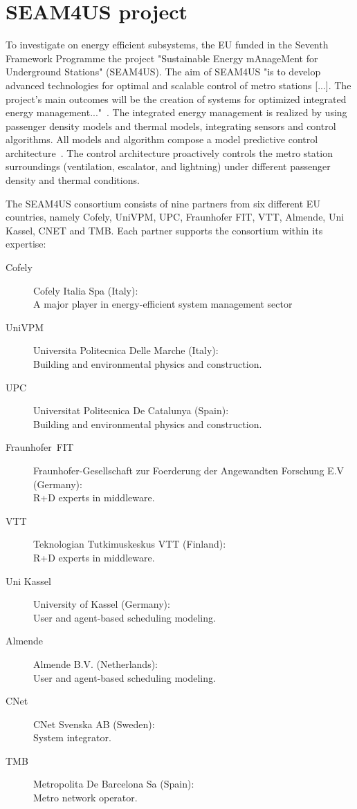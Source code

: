 
\section{SEAM4US project}
\label{sec:seam4us}

To investigate on energy efficient subsystems, the EU funded in the Seventh Framework Programme the project "Sustainable Energy mAnageMent for Underground Stations" (SEAM4US).
The aim of SEAM4US "is to develop advanced technologies for optimal and scalable control of metro stations [...]. The project's main outcomes will be the creation of systems for optimized integrated energy management..."~\cite{SEAM4US_Website}.
The integrated energy management is realized by using passenger density models and thermal models, integrating sensors and control algorithms. All models and algorithm compose a model predictive control architecture~\cite{ansuini_models_2013}. The control architecture proactively controls the metro station surroundings (ventilation, escalator, and lightning) under different passenger density and thermal conditions.

The SEAM4US consortium consists of nine partners from six different EU countries, namely Cofely, UniVPM, UPC, Fraunhofer FIT, VTT, Almende, Uni Kassel, CNET and TMB. Each partner supports the consortium within its expertise:

\begin{description}
  \item[Cofely] Cofely Italia Spa (Italy):\\A major player in energy-efficient system management sector
  \item[UniVPM] Universita Politecnica Delle Marche (Italy):\\Building and environmental physics and construction.
  \item[UPC] Universitat Politecnica De Catalunya (Spain):\\Building and environmental physics and construction.
  \item[Fraunhofer~FIT] Fraunhofer-Gesellschaft zur Foerderung der Angewandten Forschung E.V (Germany):\\R+D experts in middleware.
  \item[VTT] Teknologian Tutkimuskeskus VTT (Finland):\\R+D experts in middleware.
  \item[Uni Kassel] University of Kassel (Germany):\\User and agent-based scheduling modeling.
  \item[Almende] Almende B.V. (Netherlands):\\User and agent-based scheduling modeling.
  \item[CNet] CNet Svenska AB (Sweden):\\System integrator.
  \item[TMB] Metropolita De Barcelona Sa (Spain):\\Metro network operator.
\end{description}


